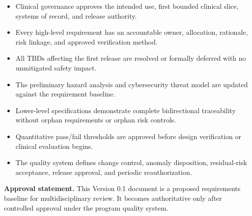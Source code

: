 \documentclass[11pt,letterpaper]{article}
\begin{document}
\begin{itemize}
\item Clinical governance approves the intended use, first bounded clinical slice, systems of record, and release authority.
\item Every high-level requirement has an accountable owner, allocation, rationale, risk linkage, and approved verification method.
\item All TBDs affecting the first release are resolved or formally deferred with no unmitigated safety impact.
\item The preliminary hazard analysis and cybersecurity threat model are updated against the requirement baseline.
\item Lower-level specifications demonstrate complete bidirectional traceability without orphan requirements or orphan risk controls.
\item Quantitative pass\slash\allowbreak{}fail thresholds are approved before design verification or clinical evaluation begins.
\item The quality system defines change control, anomaly disposition, residual-risk acceptance, release approval, and periodic reauthorization.
\end{itemize}

\textbf{Approval statement. }This Version 0.1 document is a proposed requirements baseline for multidisciplinary review. It becomes authoritative only after controlled approval under the program quality system.
\end{document}
